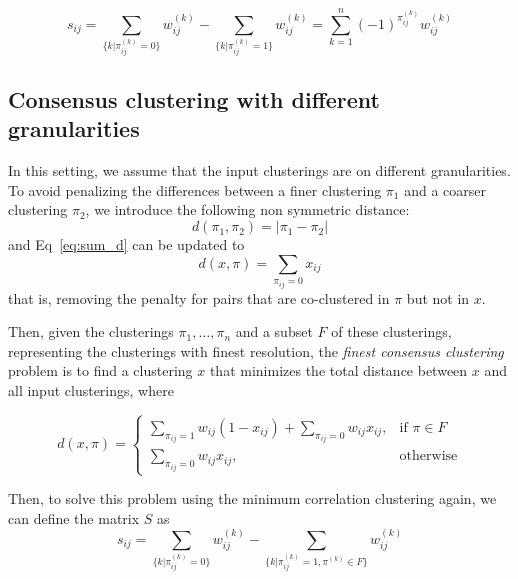 \documentclass[a4paper,UKenglish]{lipics-v2016}
\begin{document}
\begin{equation}
	\label{eq:s_definition}
s_{ij} = \sum_{\{k | \pi^{(k)}_{ij} = 0 \}} w^{(k)}_{ij} - \sum_{\{k | \pi^{(k)}_{ij} = 1 \}} w^{(k)}_{ij} = \sum_{k=1}^n (-1)^{\pi^{(k)}_{ij}}w^{(k)}_{ij} 
\end{equation}


\subsection{Consensus clustering with different granularities}

In this setting, we assume that the input clusterings are on different granularities. To avoid penalizing the differences between a finer clustering $\pi_1$ and
a coarser clustering $\pi_2$, we introduce the following non symmetric distance:
 \begin{equation}
 	d(\pi_1,\pi_2) = | \pi_1 - \pi_2 | 
\end{equation}
and Eq~\eqref{eq:sum_d} can be updated to 
 \begin{equation}
	\label{eq:sum_asymm}
	d(x,\pi) = \sum_{\pi_{ij} = 0} x_{ij}
 \end{equation}
that is, removing the penalty for pairs that are co-clustered in $\pi$ but not in $x$.

Then, given the clusterings $\pi_1, \dots, \pi_n$ and a subset $F$ of these
clusterings, representing the clusterings with finest resolution, the 
\emph{finest consensus clustering} problem is to find a clustering $x$ that
minimizes the total distance between $x$ and all input clusterings, where 

\begin{equation} \label{eq:d_assym}
d(x,\pi) = \begin{cases}  \sum_{\pi_{ij} = 1} w_{ij}(1 - x_{ij}) + \sum_{\pi_{ij} = 0}w_{ij} x_{ij},& \text{if } \pi \in F\\
    \sum_{\pi_{ij} = 0}w_{ij} x_{ij}, & \text{otherwise}
\end{cases}
\end{equation}

Then, to solve this problem using the minimum correlation clustering again, we can define the matrix $S$ as
\begin{equation}
	\label{eq:s_assym}
s_{ij} = \sum_{\{k | \pi^{(k)}_{ij} = 0 \}} w^{(k)}_{ij} - \sum_{\{k | \pi^{(k)}_{ij} = 1, \pi^{(k)} \in F\}} w^{(k)}_{ij}
\end{equation}
\end{document}
